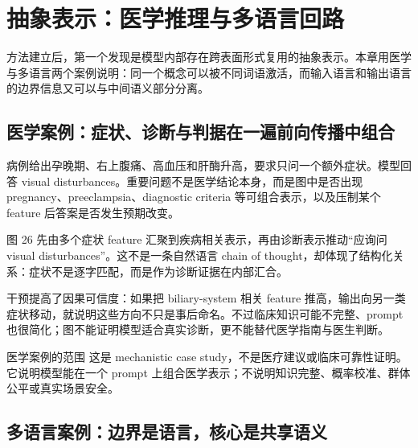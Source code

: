 \section{抽象表示：医学推理与多语言回路}

方法建立后，第一个发现是模型内部存在跨表面形式复用的抽象表示。本章用医学与多语言两个案例说明：同一个概念可以被不同词语激活，而输入语言和输出语言的边界信息又可以与中间语义部分分离。

\subsection{医学案例：症状、诊断与判据在一遍前向传播中组合}

病例给出孕晚期、右上腹痛、高血压和肝酶升高，要求只问一个额外症状。模型回答 visual disturbances。重要问题不是医学结论本身，而是图中是否出现 pregnancy、preeclampsia、diagnostic criteria 等可组合表示，以及压制某个 feature 后答案是否发生预期改变。



图 26 先由多个症状 feature 汇聚到疾病相关表示，再由诊断表示推动“应询问 visual disturbances”。这不是一条自然语言 chain of thought，却体现了结构化关系：症状不是逐字匹配，而是作为诊断证据在内部汇合。


干预提高了因果可信度：如果把 biliary-system 相关 feature 推高，输出向另一类症状移动，就说明这些方向不只是事后命名。不过临床知识可能不完整、prompt 也很简化；图不能证明模型适合真实诊断，更不能替代医学指南与医生判断。

\begin{warningbox}{医学案例的范围}
这是 mechanistic case study，不是医疗建议或临床可靠性证明。它说明模型能在一个 prompt 上组合医学表示；不说明知识完整、概率校准、群体公平或真实场景安全。
\end{warningbox}


\subsection{多语言案例：边界是语言，核心是共享语义}

